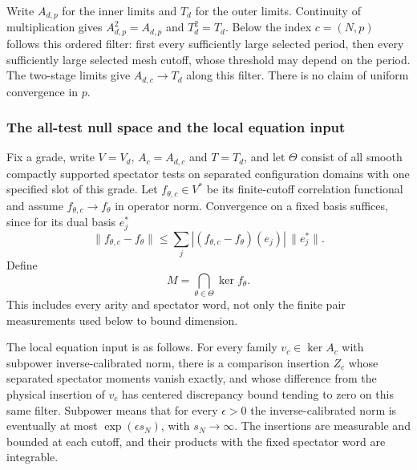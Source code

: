 Write $A_{d,p}$ for the inner limits and $T_d$ for the outer limits.
Continuity of multiplication gives $A_{d,p}^2=A_{d,p}$ and $T_d^2=T_d$.
Below the index $c=(N,p)$ follows this ordered filter: first every
sufficiently large selected period, then every sufficiently large
selected mesh cutoff, whose threshold may depend on the period. The
two-stage limits give $A_{d,c}\to T_d$ along this filter. There is no
claim of uniform convergence in $p$.

\subsubsection{The all-test null space and the local equation input}

Fix a grade, write $V=V_d$, $A_c=A_{d,c}$ and $T=T_d$, and let
$\Theta$ consist of all smooth compactly supported spectator tests
on separated configuration domains with one specified slot of this
grade. Let $f_{\theta,c}\in V^*$ be its finite-cutoff correlation
functional and assume $f_{\theta,c}\to f_\theta$ in operator norm.
Convergence on a fixed basis suffices, since for its dual basis $e_j^*$
\[
 \|f_{\theta,c}-f_\theta\|
 \le\sum_j |(f_{\theta,c}-f_\theta)(e_j)|\,\|e_j^*\|.
\]
Define
\[
                         M=\bigcap_{\theta\in\Theta}\ker f_\theta.
\]
This includes every arity and spectator word, not only the finite pair
measurements used below to bound dimension.

The local equation input is as follows. For every family
$v_c\in\ker A_c$ with subpower inverse-calibrated norm, there is a
comparison insertion $Z_c$ whose separated spectator moments vanish
exactly, and whose difference from the physical insertion of $v_c$
has centered discrepancy bound tending to zero on this same filter.
Subpower means that for every $\epsilon>0$ the inverse-calibrated norm
is eventually at most $\exp(\epsilon s_N)$, with $s_N\to\infty$.
The insertions are measurable and bounded at each cutoff, and their
products with the fixed spectator word are integrable.

